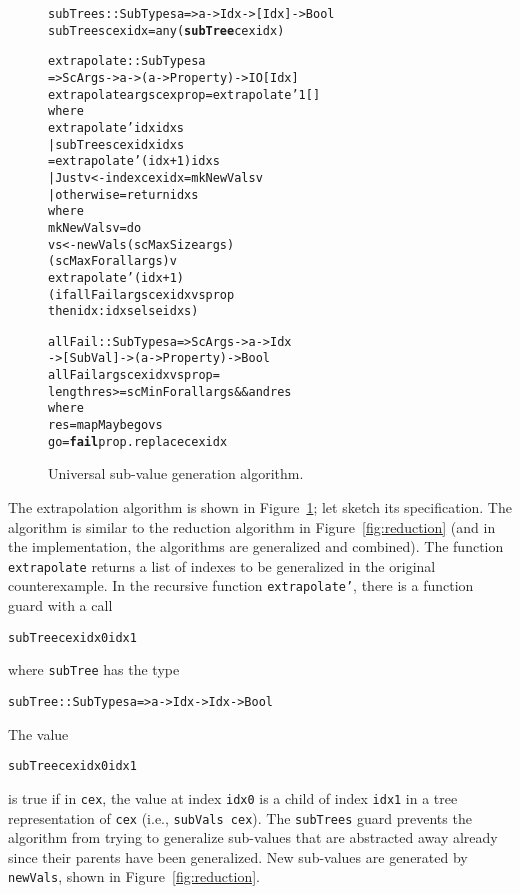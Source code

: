 \documentclass{sigplanconf}
\newenvironment{code}{\begin{alltt}\footnotesize}{\end{alltt}}
\newcommand{\ttp}[1]{\texttt{#1}}
\newcommand{\undef}[1]{{\bf #1}}
\begin{document}
\begin{figure}
  \begin{code}
subTrees :: SubTypes a => a -> Idx -> [Idx] -> Bool
subTrees cex idx = any (\undef{subTree} cex idx)

extrapolate :: SubTypes a
  => ScArgs -> a -> (a -> Property) -> IO [Idx]
extrapolate args cex prop = extrapolate' 1 []
  where
  extrapolate' idx idxs
    | subTrees cex idx idxs
    = extrapolate' (idx+1) idxs
    | Just v <- index cex idx = mkNewVals v
    | otherwise = return idxs
    where
    mkNewVals v = do
      vs <- newVals (scMaxSize args)
                    (scMaxForall args) v
      extrapolate' (idx+1)
        (if allFail args cex idx vs prop
           then idx:idxs else idxs)

allFail :: SubTypes a => ScArgs -> a -> Idx
  -> [SubVal] -> (a -> Property) -> Bool
allFail args cex idx vs prop =
  length res >= scMinForall args && and res
  where
  res  = mapMaybe go vs
  go   = \undef{fail} prop . replace cex idx
  \end{code}
  \caption{Universal sub-value generation algorithm.}
  \label{fig:universal}
\end{figure}

The extrapolation algorithm is shown in Figure~\ref{fig:universal}; let sketch
its specification.  The algorithm is similar to the reduction algorithm in
Figure~\ref{fig:reduction} (and in the implementation, the algorithms are
generalized and combined).  The function \ttp{extrapolate} returns a list of
indexes to be generalized in the original counterexample.  In the recursive
function \ttp{extrapolate'}, there is a function guard with a call
%
\begin{code}
subTree cex idx0 idx1
\end{code}
%
\noindent
where \ttp{subTree} has the type
%
\begin{code}
subTree :: SubTypes a => a -> Idx -> Idx -> Bool
\end{code}
%
\noindent
The value
%
\begin{code}
subTree cex idx0 idx1
\end{code}
%
is true if in \ttp{cex}, the value at index \ttp{idx0} is a child of index
\ttp{idx1} in a tree representation of \ttp{cex} (i.e., \ttp{subVals cex}).  The
\ttp{subTrees} guard prevents the algorithm from trying to generalize sub-values
that are abstracted away already since their parents have been generalized.
New sub-values are generated by \ttp{newVals}, shown in
Figure~\ref{fig:reduction}.
\end{document}
